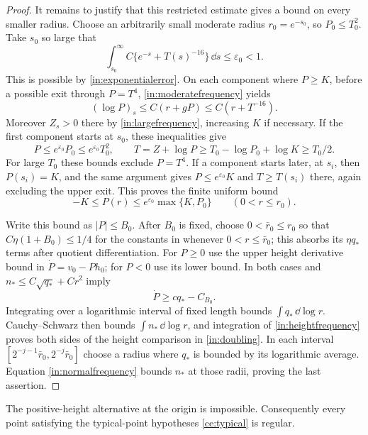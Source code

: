 \begin{proof}
It remains to justify that this restricted estimate gives a bound on
every smaller radius.  Choose an arbitrarily small moderate radius
$r_0=e^{-s_0}$, so $P_0\leq T_0^2$.  Take $s_0$ so large that
\[
 \int_{s_0}^{\infty}C\{e^{-s}+T(s)^{-16}\}\,\dd s
       \leq\varepsilon_0<1.
\]
This is possible by \eqref{in:exponentialerror}.  On each component
where $P\geq K$, before a possible exit through $P=T^4$,
\eqref{in:moderatefrequency} yields
\[
 (\log P)_s\leq C(r+gP)\leq C(r+T^{-16}).
\]
Moreover $Z_s>0$ there by \eqref{in:largefrequency}, increasing $K$
if necessary.  If the first component starts at $s_0$, these inequalities
give
\[
 P\leq e^{\varepsilon_0}P_0\leq e^{\varepsilon_0}T_0^2,
 \qquad
 T=Z+\log P\geq T_0-\log P_0+\log K\geq T_0/2.
\]
For large $T_0$ these bounds exclude $P=T^4$.  If a component starts
later, at $s_i$, then $P(s_i)=K$, and the same argument gives
$P\leq e^{\varepsilon_0}K$ and $T\geq T(s_i)$ there, again excluding
the upper exit.  This proves the finite uniform bound
\[
 -K\leq P(r)\leq e^{\varepsilon_0}\max\{K,P_0\}
                     \qquad(0<r\leq r_0).
\]

Write this bound as $|P|\leq B_0$.  After $B_0$ is fixed, choose
$0<\bar r_0\leq r_0$ so that $C\eta(1+B_0)\leq1/4$ for the constants in
 whenever $0<r\leq\bar r_0$; this absorbs its
$\eta q_*$ terms after quotient differentiation.  For $P\geq0$ use the
upper height derivative bound in $\dot P=v_0-Ph_0$; for $P<0$ use its
lower bound.  In both cases  and
$n_*\leq C\sqrt{q_*}+Cr^2$ imply
\begin{equation}\label{in:integralenergy}
 \dot P\geq cq_*-C_{B_0}.
\end{equation}
Integrating over a logarithmic interval of fixed length bounds
$\int q_*\,\dd\log r$.  Cauchy--Schwarz then bounds
$\int n_*\,\dd\log r$, and integration of
\eqref{in:heightfrequency} proves both sides of the height comparison
in \eqref{in:doubling}.  In each interval
$[2^{-j-1}\bar r_0,2^{-j}\bar r_0]$ choose a radius where $q_*$ is
bounded by its logarithmic average.  Equation \eqref{in:normalfrequency}
bounds $n_*$ at those radii, proving the last assertion.
\end{proof}

\begin{proposition}\label{in:finish}
The positive-height alternative at the origin is impossible.
Consequently every point satisfying the typical-point hypotheses \eqref{ce:typical} is regular.
\end{proposition}


